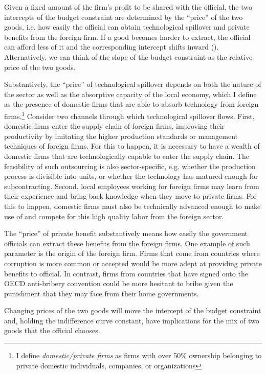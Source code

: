 Given a fixed amount of the firm's profit to be shared with the official, the two intercepts of the budget constraint are determined by the ``price'' of the two goods, i.e. how easily the official can obtain technological spillover and private benefits from the foreign firm. If a good becomes harder to extract, the official can afford less of it and the corresponding intercept shifts inward (). Alternatively, we can think of the slope of the budget constraint as the relative price of the two goods.

Substantively, the ``price'' of technological spillover depends on both the nature of the sector as well as the absorptive capacity of the local economy, which I define as the presence of domestic firms that are able to absorb technology from foreign firms.\footnote{I define \textit{domestic/private firms} as firms with over 50\% ownership belonging to private domestic individuals, companies, or organizations} Consider two channels through which technological spillover flows. First, domestic firms enter the supply chain of foreign firms, improving their productivity by imitating the higher production standards or management techniques of foreign firms. For this to happen, it is necessary to have a wealth of domestic firms that are technologically capable to enter the supply chain. The feasibility of such outsourcing is also sector-specific, e.g. whether the production process is divisible into units, or whether the technology has matured enough for subcontracting. Second, local employees working for foreign firms may learn from their experience and bring back knowledge when they move to private firms. For this to happen, domestic firms must also be technically advanced enough to make use of and compete for this high quality labor from the foreign sector.

The ``price'' of private benefit substantively means how easily the government officials can extract these benefits from the foreign firms. One example of such parameter is the origin of the foreign firm. Firms that come from countries where corruption is more common or accepted would be more adept at providing private benefits to official. In contrast, firms from countries that have signed onto the OECD anti-bribery convention could be more hesitant to bribe given the punishment that they may face from their home governments.

Changing prices of the two goods will move the intercept of the budget constraint and, holding the indifference curve constant, have implications for the mix of two goods that the official chooses.

